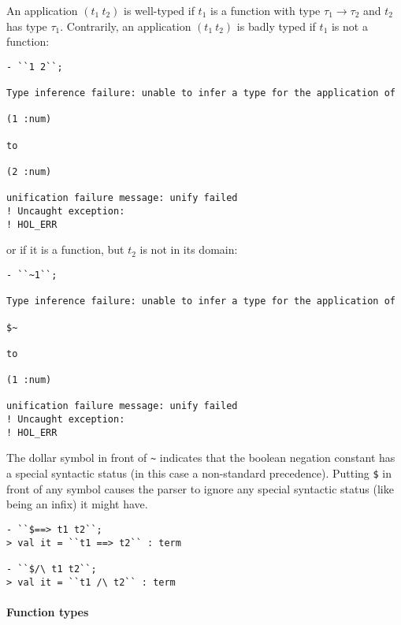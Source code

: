 An application $(t_1\ t_2)$ is well-typed if $t_1$ is a function with type $\tau_1 \to \tau_2$ and $t_2$ has type $\tau_1$.
Contrarily, an application $(t_1\ t_2)$ is badly typed if $t_1$ is not a function:

\begin{session}
\begin{verbatim}
- ``1 2``;

Type inference failure: unable to infer a type for the application of

(1 :num)

to

(2 :num)

unification failure message: unify failed
! Uncaught exception:
! HOL_ERR
\end{verbatim}
\end{session}

\noindent or if it is a function, but $t_2$ is not in its domain:

\begin{session}
\begin{verbatim}
- ``~1``;

Type inference failure: unable to infer a type for the application of

$~

to

(1 :num)

unification failure message: unify failed
! Uncaught exception:
! HOL_ERR
\end{verbatim}
\end{session}

The dollar symbol in front of {\small\verb|~|} indicates that the boolean negation constant has a special syntactic status (in this case a non-standard precedence).
Putting {\small\verb|$|} in front of any symbol causes the parser to ignore any special syntactic status (like being an infix) it might have.

\begin{session}
\begin{verbatim}
- ``$==> t1 t2``;
> val it = ``t1 ==> t2`` : term

- ``$/\ t1 t2``;
> val it = ``t1 /\ t2`` : term
\end{verbatim}
\end{session}

\paragraph{Function types}

